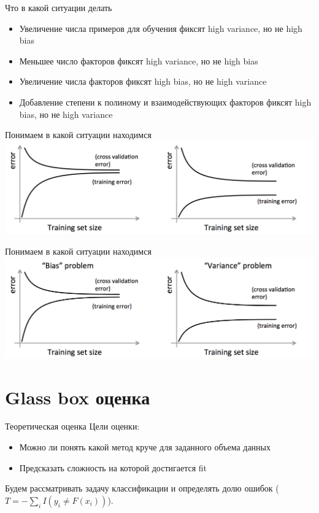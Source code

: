 \documentclass[14pt, fleqn, xcolor={dvipsnames, table}]{beamer}
\begin{document}
\begin{frame}{Что в какой ситуации делать}
\begin{itemize}
  \item Увеличение числа примеров для обучения фиксят high variance, но не high bias
  \item Меньшее число факторов фиксят high variance, но не high bias
  \item Увеличение числа факторов фиксят high bias, но не high variance
  \item Добавление степени к полиному и взаимодействующих факторов фиксят high bias, но не high variance
\end{itemize}
\end{frame}

\begin{frame}{Понимаем в какой ситуации находимся}
\centering
\includegraphics[width=1.0\textwidth]{bias_error.png}
\end{frame}

\begin{frame}{Понимаем в какой ситуации находимся}
\centering
\includegraphics[width=1.0\textwidth]{bias_error_2.png}
\end{frame}


\section{Glass box оценка}
\begin{frame}{Теоретическая оценка}
Цели оценки:
\begin{itemize}
  \item Можно ли понять какой метод круче для заданного объема данных
  \item Предсказать сложность на которой достигается fit
\end{itemize}
Будем рассматривать задачу классификации и определять долю ошибок ($T = -\sum_i I(y_i \ne F(x_i))$). 
\end{frame}
\end{document}
